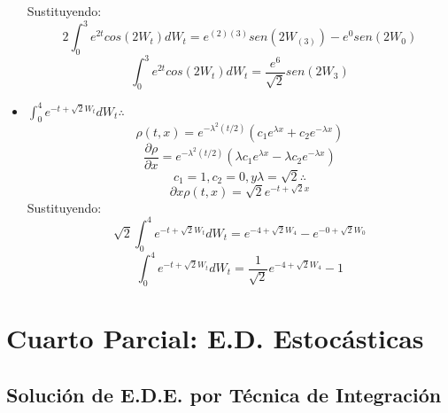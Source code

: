 \documentclass[11pt,fleqn]{book} %
\numberwithin{equation}{section} %
\numberwithin{figure}{section} %
\numberwithin{table}{section} %
\begin{document}
\begin{itemize}
    Sustituyendo:
    $$ 2 \int_{0}^{3} e^{2t} cos(2 W_{t}) dW_{t} = e^{(2)(3)} sen(2 W_{(3)}) - e^{0} sen(2 W_{0})$$
    $$ \int_{0}^{3} e^{2t} cos(2 W_{t}) dW_{t} = \frac{e^{6}}{\sqrt{2}} sen(2 W_{3}) $$
    \item $\int_{0}^{4} e^{-t + \sqrt{2} W_{t}} dW_{t} \therefore$
    $$\rho(t,x) = e^{-\lambda^{2} (t/2)} (c_{1} e^{\lambda x} + c_{2} e^{-\lambda x} ) $$
    $$ \frac{\partial \rho}{\partial x} = e^{-\lambda^{2} (t/2)} ( \lambda c_{1} e^{\lambda x} - \lambda c_{2} e^{-\lambda x} )    $$
    $$c_{1} = 1, c_{2} = 0, y \lambda = \sqrt{2} \therefore$$
    $$ \partial x \rho(t,x) = \sqrt{2} e^{-t + \sqrt{2} x}$$
    Sustituyendo:
    $$ \sqrt{2} \int_{0}^{4} e^{-t + \sqrt{2} W_{t}}  dW_{t} = e^{-4 + \sqrt{2} W_{4}} - e^{-0 + \sqrt{2} W_{0}} $$
    $$ \int_{0}^{4} e^{-t + \sqrt{2} W_{t}}  dW_{t} = \frac{1}{\sqrt{2}} e^{-4 + \sqrt{2} W_{4}} - 1  $$
\end{itemize}
\chapterimage{} %
\chapter{Cuarto Parcial: E.D. Estocásticas}
\section{Solución de E.D.E. por Técnica de Integración}
\end{document}
